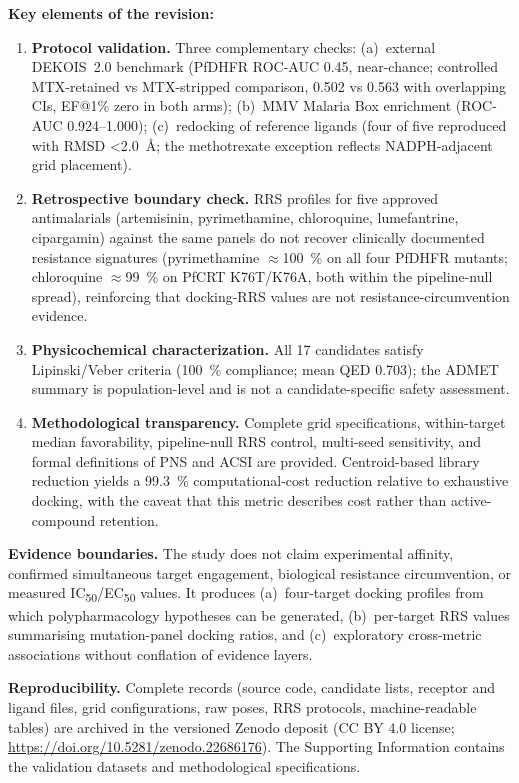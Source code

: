 \documentclass[9pt,letterpaper]{article}
\begin{document}
\noindent\textbf{Key elements of the revision:}
\begin{enumerate}
\item \textbf{Protocol validation.} Three complementary checks: (a)~external DEKOIS~2.0 benchmark (PfDHFR ROC-AUC \num{0.45}, near-chance; controlled MTX-retained vs MTX-stripped comparison, \num{0.502} vs \num{0.563} with overlapping CIs, EF@1\% zero in both arms); (b)~MMV Malaria Box enrichment (ROC-AUC \numrange{0.924}{1.000}); (c)~redocking of reference ligands (four of five reproduced with RMSD \qty{<2.0}{\angstrom}; the methotrexate exception reflects NADPH-adjacent grid placement).
\item \textbf{Retrospective boundary check.} RRS profiles for five approved antimalarials (artemisinin, pyrimethamine, chloroquine, lumefantrine, cipargamin) against the same panels do not recover clinically documented resistance signatures (pyrimethamine $\approx$\qty{100}{\percent} on all four PfDHFR mutants; chloroquine $\approx$\qty{99}{\percent} on PfCRT K76T/K76A, both within the pipeline-null spread), reinforcing that docking-RRS values are not resistance-circumvention evidence.
\item \textbf{Physicochemical characterization.} All 17 candidates satisfy Lipinski/Veber criteria (\qty{100}{\percent} compliance; mean QED \num{0.703}); the ADMET summary is population-level and is not a candidate-specific safety assessment.
\item \textbf{Methodological transparency.} Complete grid specifications, within-target median favorability, pipeline-null RRS control, multi-seed sensitivity, and formal definitions of PNS and ACSI are provided. Centroid-based library reduction yields a \qty{99.3}{\percent} computational-cost reduction relative to exhaustive docking, with the caveat that this metric describes cost rather than active-compound retention.
\end{enumerate}

\noindent\textbf{Evidence boundaries.} The study does not claim experimental affinity, confirmed simultaneous target engagement, biological resistance circumvention, or measured IC\textsubscript{50}/EC\textsubscript{50} values. It produces (a)~four-target docking profiles from which polypharmacology hypotheses can be generated, (b)~per-target RRS values summarising mutation-panel docking ratios, and (c)~exploratory cross-metric associations without conflation of evidence layers.

\noindent\textbf{Reproducibility.} Complete records (source code, candidate lists, receptor and ligand files, grid configurations, raw poses, RRS protocols, 
machine-readable tables) are archived in the versioned Zenodo deposit (CC BY 4.0 license; 
\url{https://doi.org/10.5281/zenodo.22686176}). The Supporting Information contains the validation datasets and methodological specifications.
\end{document}
